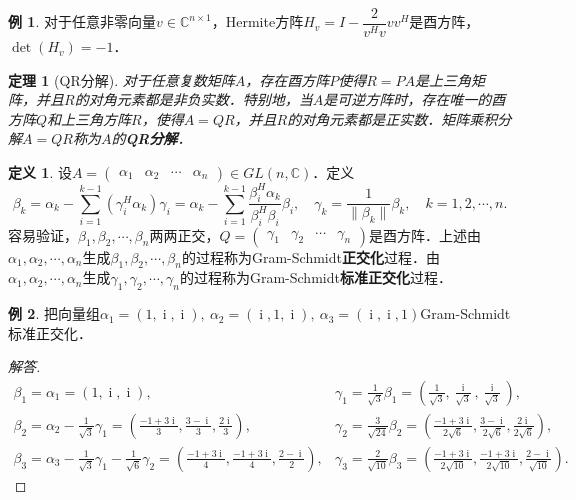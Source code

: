 \documentclass[a4paper,fontset=windows]{ctexbook}
\newtheorem{theorem}{定理}[chapter]
\theoremstyle{definition}
\newtheorem{definition}{定义}[chapter]
\newtheorem{example}{例}[chapter]
\DeclareMathOperator{\I}{i}
\begin{document}
\begin{example}\label{ex6.12}
对于任意非零向量$v\in\mathbb{C}^{n\times 1}$，Hermite方阵$H_v=I-\dfrac{2}{v^Hv}vv^H$是酉方阵，$\det(H_v)=-1$．
\end{example}

\begin{theorem}[QR分解]
对于任意复数矩阵$A$，存在酉方阵$P$使得$R=PA$是上三角矩阵，并且$R$的对角元素都是非负实数．特别地，当$A$是可逆方阵时，存在唯一的酉方阵$Q$和上三角方阵$R$，使得$A=QR$，并且$R$的对角元素都是正实数．矩阵乘积分解$A=QR$称为$A$的{\bf QR分解}．
\end{theorem}

\begin{definition}
设$A=\begin{pmatrix}\alpha_1&\alpha_2&\cdots&\alpha_n\end{pmatrix}\in GL(n,\mathbb{C})$．定义
$$\beta_k=\alpha_k-\sum_{i=1}^{k-1}(\gamma_i^H\alpha_k)\gamma_i=\alpha_k-\sum_{i=1}^{k-1}\frac{\beta_i^H\alpha_k}{\beta_i^H\beta_i}\beta_i,\quad\gamma_k=\frac{1}{\|\beta_k\|}\beta_k,\quad k=1,2,\cdots,n.$$
容易验证，$\beta_1,\beta_2,\cdots,\beta_n$两两正交，$Q=\begin{pmatrix}\gamma_1&\gamma_2&\cdots&\gamma_n\end{pmatrix}$是酉方阵．上述由$\alpha_1,\alpha_2,\cdots,\alpha_n$生成$\beta_1,\beta_2,\cdots,\beta_n$的过程称为Gram-Schmidt{\bf 正交化}过程．由$\alpha_1,\alpha_2,\cdots,\alpha_n$生成$\gamma_1,\gamma_2,\cdots,\gamma_n$的过程称为Gram-Schmidt{\bf 标准正交化}过程．
\end{definition}

\begin{example}
把向量组$\alpha_1=(1,\I,\I),~\alpha_2=(\I,1,\I),~\alpha_3=(\I,\I,1)$Gram-Schmidt标准正交化．
\end{example}

\begin{proof}[解答] ~ \\[-29pt]
$$\begin{array}{lll}
\beta_1=\alpha_1=(1,\I,\I), &\gamma_1=\frac{1}{\sqrt{3}}\beta_1=(\frac{1}{\sqrt{3}},\frac{\I}{\sqrt{3}},\frac{\I}{\sqrt{3}}), \\
\beta_2=\alpha_2-\frac{1}{\sqrt{3}}\gamma_1=(\frac{-1+3\I}{3},\frac{3-\I}{3},\frac{2\I}{3}), &\gamma_2=\frac{3}{\sqrt{24}}\beta_2=(\frac{-1+3\I}{2\sqrt{6}},\frac{3-\I}{2\sqrt{6}},\frac{2\I}{2\sqrt{6}}), \\
\beta_3=\alpha_3-\frac{1}{\sqrt{3}}\gamma_1-\frac{1}{\sqrt{6}}\gamma_2=(\frac{-1+3\I}{4},\frac{-1+3\I}{4},\frac{2-\I}{2}), &\gamma_3=\frac{2}{\sqrt{10}}\beta_3=(\frac{-1+3\I}{2\sqrt{10}},\frac{-1+3\I}{2\sqrt{10}},\frac{2-\I}{\sqrt{10}}).
\end{array}$$
\end{proof}
\end{document}
